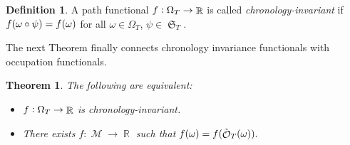\documentclass[11pt]{article}
\theoremstyle{plain}
\newtheorem{theorem}{Theorem}[section]
\theoremstyle{definition}
\newtheorem{definition}{Definition}
\DeclareMathOperator{\R}{\mathbb{R}}
\DeclareMathOperator{\calC}{\mathcal{C}}
\DeclareMathOperator{\calM}{\mathcal{M}}
\DeclareMathOperator{\calO}{\mathcal{O}}
\DeclareMathOperator{\frakS}{\mathfrak{S}}
\begin{document}
\begin{definition}
    A path functional $\textnormal{f}:\Omega_T \to \R$ is called \textit{chronology-invariant} if $\textnormal{f}(\omega\circ \psi ) = \textnormal{f}(\omega)$ for all $\omega\in \Omega_T$, $\psi \in \frakS_T$.  
\end{definition}    
The next Theorem finally connects chronology invariance functionals with occupation functionals. 

\begin{theorem}
    \label{thm:chronology}  
The following are equivalent:
 
 \begin{itemize} 
     \item[\textnormal{I.}]  $\textnormal{f}:\Omega_T \to \R$ is chronology-invariant.
     \item[\textnormal{II.}]There exists   $f:\calM \to \R$ such that $\textnormal{f}(\omega) = f(\tilde{\calO}_T(\omega)).$
 \end{itemize}
\end{theorem}
\end{document}
